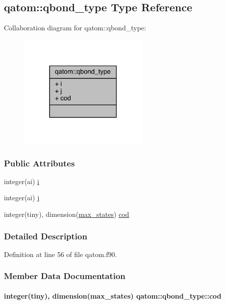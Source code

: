 \hypertarget{structqatom_1_1qbond__type}{\subsection{qatom\-:\-:qbond\-\_\-type Type Reference}
\label{structqatom_1_1qbond__type}
}


Collaboration diagram for qatom\-:\-:qbond\-\_\-type\-:
\nopagebreak
\begin{figure}[H]
\begin{center}
\leavevmode
\includegraphics[width=182pt]{structqatom_1_1qbond__type__coll__graph}
\end{center}
\end{figure}
\subsubsection*{Public Attributes}
\begin{DoxyCompactItemize}
\item 
integer(ai) \hyperlink{structqatom_1_1qbond__type_a3660ec38d3107d468a2bb3597f1c91c6}{i}
\item 
integer(ai) \hyperlink{structqatom_1_1qbond__type_a94de62ec7d722ec75f10629975e8c579}{j}
\item 
integer(tiny), dimension(\hyperlink{classqatom_ad89179e7bcdef29e13211330d1b8fd20}{max\-\_\-states}) \hyperlink{structqatom_1_1qbond__type_ab8c83d849652361e15a2452da9697b98}{cod}
\end{DoxyCompactItemize}


\subsubsection{Detailed Description}


Definition at line 56 of file qatom.\-f90.



\subsubsection{Member Data Documentation}
\hypertarget{structqatom_1_1qbond__type_ab8c83d849652361e15a2452da9697b98}{
\paragraph[{cod}]{\setlength{\rightskip}{0pt plus 5cm}integer(tiny), dimension({\bf max\-\_\-states}) qatom\-::qbond\-\_\-type\-::cod}}\label{structqatom_1_1qbond__type_ab8c83d849652361e15a2452da9697b98}


